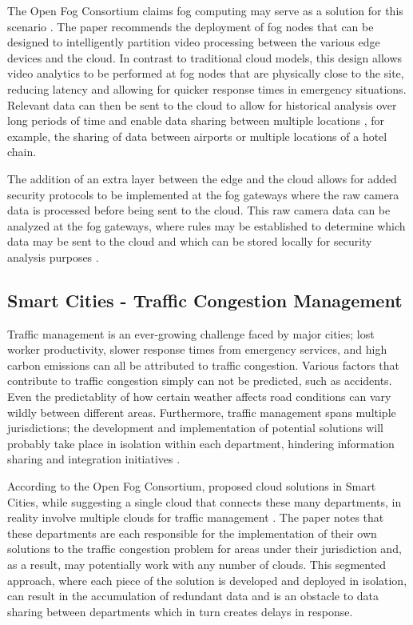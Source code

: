 \documentclass{article}
\begin{document}
The Open Fog Consortium claims fog computing may serve as a solution for this scenario \cite{openfogconsortium2017visualsecurity}. The paper recommends the deployment of fog nodes that can be designed to intelligently partition video processing between the various edge devices and the cloud. In contrast to traditional cloud models, this design allows video analytics to be performed at fog nodes that are physically close to the site, reducing latency and allowing for quicker response times in emergency situations. Relevant data can then be sent to the cloud to allow for historical analysis over long periods of time and enable data sharing between multiple locations \cite{openfogconsortium2017visualsecurity}, for example, the sharing of data between airports or multiple locations of a hotel chain.

The addition of an extra layer between the edge and the cloud allows for added security protocols to be implemented at the fog gateways where the raw camera data is processed before being sent to the cloud. This raw camera data can be analyzed at the fog gateways, where rules may be established to determine which data may be sent to the cloud and which can be stored locally for security analysis purposes \cite{openfogconsortium2017visualsecurity}.

\subsection{Smart Cities - Traffic Congestion Management}
Traffic management is an ever-growing challenge faced by major cities; lost worker productivity, slower response times from emergency services, and high carbon emissions can all be attributed to traffic congestion. Various factors that contribute to traffic congestion simply can not be predicted, such as accidents. Even the predictablity of how certain weather affects road conditions can vary wildly between different areas. Furthermore, traffic management spans multiple jurisdictions; the development and implementation of potential solutions will probably take place in isolation within each department, hindering information sharing and integration initiatives \cite{openfogconsortium2017trafficmanagement}.

According to the Open Fog Consortium, proposed cloud solutions in Smart Cities, while suggesting a single cloud that connects these many departments, in reality involve multiple clouds for traffic management \cite{openfogconsortium2017trafficmanagement}. The paper notes that these departments are each responsible for the implementation of their own solutions to the traffic congestion problem for areas under their jurisdiction and, as a result, may potentially work with any number of clouds. This segmented approach, where each piece of the solution is developed and deployed in isolation, can result in the accumulation of redundant data and is an obstacle to data sharing between departments which in turn creates delays in response.
\end{document}
